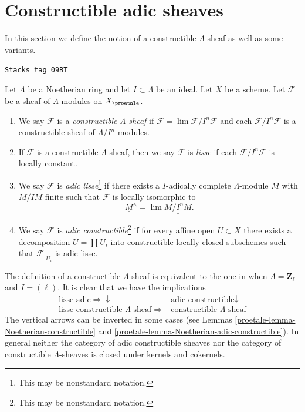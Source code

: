 \section{Constructible adic sheaves}
\label{proetale-section-adic}
In this section we define the notion of a constructible
$\Lambda$-sheaf as well as some variants.

\begin{definition}[Adic]
\label{proetale-definition-adic}
\href{https://stacks.math.columbia.edu/tag/09BT}{\texttt{Stacks tag 09BT}}

Let $\Lambda$ be a Noetherian ring and let $I \subset \Lambda$ be an ideal.
Let $X$ be a scheme. Let $\mathcal{F}$ be a sheaf of $\Lambda$-modules
on $X_\proetale$.
\begin{enumerate}
\item We say $\mathcal{F}$ is a {\it constructible $\Lambda$-sheaf}
if $\mathcal{F} = \lim \mathcal{F}/I^n\mathcal{F}$ and each
$\mathcal{F}/I^n\mathcal{F}$ is a constructible sheaf of $\Lambda/I^n$-modules.
\item If $\mathcal{F}$ is a constructible $\Lambda$-sheaf, then we say
$\mathcal{F}$ is {\it lisse} if each $\mathcal{F}/I^n\mathcal{F}$ is
locally constant.
\item We say $\mathcal{F}$ is {\it adic lisse}\footnote{This may
be nonstandard notation.} if there exists a
$I$-adically complete $\Lambda$-module $M$ with $M/IM$ finite
such that $\mathcal{F}$ is locally isomorphic to
$$
\underline{M}^\wedge = \lim \underline{M/I^nM}.
$$
\item We say $\mathcal{F}$ is
{\it adic constructible}\footnote{This may be nonstandard notation.}
if for every affine open $U \subset X$
there exists a decomposition $U = \coprod U_i$ into
constructible locally closed subschemes such that $\mathcal{F}|_{U_i}$
is adic lisse.
\end{enumerate}
\end{definition}

The definition of a constructible $\Lambda$-sheaf is equivalent
to the one in \cite[Expos\'e VI, Definition 1.1.1]{SGA5} when
$\Lambda = \mathbf{Z}_\ell$ and $I = (\ell)$. It is clear that
we have the implications
$$
\begin{array}{cc}\text{lisse adic} \Longrightarrow\downarrow & \text{adic constructible} \downarrow \\ \text{lisse constructible }\Lambda\text{-sheaf} \Longrightarrow & \text{constructible }\Lambda\text{-sheaf}\end{array}
$$
The vertical arrows can be inverted in some cases
(see Lemmas \ref{proetale-lemma-Noetherian-constructible} and
\ref{proetale-lemma-Noetherian-adic-constructible}). In general
neither the category of adic constructible sheaves nor
the category of constructible $\Lambda$-sheaves is closed
under kernels and cokernels.

